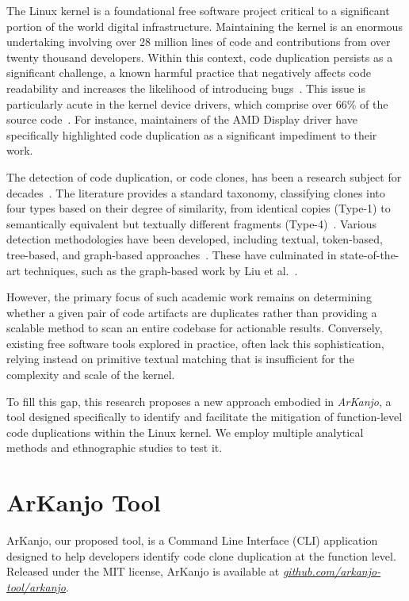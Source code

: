 \documentclass[conference]{IEEEtran}
\begin{document}
The Linux kernel is a foundational free software project 
critical to a significant portion of the world digital infrastructure. Maintaining 
the kernel is an enormous undertaking involving over 28 million lines of code 
and contributions from over twenty thousand developers. Within this context, code 
duplication persists as a significant challenge, a known harmful practice that 
negatively affects code readability and increases the likelihood of introducing
bugs~\cite{harmone,harmtwo}. This issue is particularly acute in the 
kernel device drivers, which comprise over 66\% of the source code~\cite{marcelo}. 
For instance, maintainers of the AMD Display driver have specifically highlighted code 
duplication as a significant impediment to their work.

The detection of code duplication, or code clones, has been a research subject for 
decades~\cite{firstman}. The literature provides a standard taxonomy, classifying 
clones into four types based on their degree of similarity, from identical copies 
(Type-1) to semantically equivalent but textually different fragments (Type-4)~\cite{litreview}. 
Various detection methodologies have been developed, including textual, token-based, 
tree-based, and graph-based approaches~\cite{litreview}. These have culminated in 
state-of-the-art techniques, such as the graph-based work by Liu et al.~\cite{tailor}.

However, the primary focus of such academic work remains on determining whether a given 
pair of code artifacts are duplicates rather than providing a scalable method to scan 
an entire codebase for actionable results. Conversely, existing free software tools explored 
in practice, often lack this sophistication, relying instead on primitive textual matching 
that is insufficient for the complexity and scale of the kernel.

To fill this gap, this research proposes a new approach embodied in \textit{ArKanjo}, a tool 
designed specifically to identify and facilitate the mitigation of function-level code 
duplications within the Linux kernel. We employ multiple analytical 
methods and ethnographic studies to test it.


\section{ArKanjo Tool}

ArKanjo, our proposed tool, is a Command Line Interface (CLI) application designed to
help developers identify code clone duplication at the function level. Released under the
MIT license, ArKanjo is available at 
\textit{\href{https://github.com/arkanjo-tool/arkanjo}{github.com/arkanjo-tool/arkanjo}}.
\end{document}
